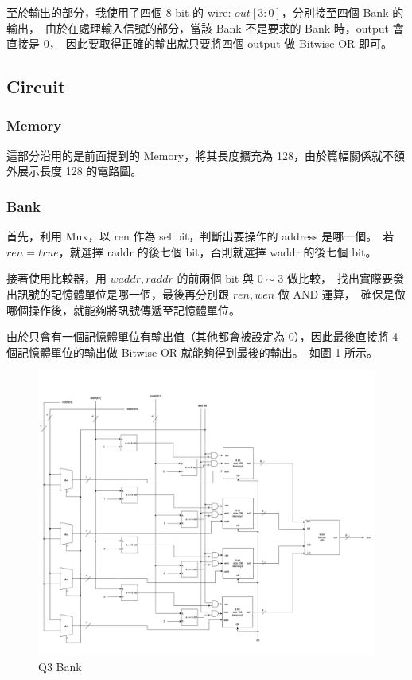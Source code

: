 \documentclass[10.5pt,compsoc,UTF8]{CjC}
\theoremstyle{mystyle}
\begin{document}
至於輸出的部分，我使用了四個 8 bit 的 wire: $out[3:0]$，分別接至四個 Bank 的輸出，\
由於在處理輸入信號的部分，當該 Bank 不是要求的 Bank 時，output 會直接是 $0$，\
因此要取得正確的輸出就只要將四個 output 做 Bitwise OR 即可。

\newpage

\subsection{Circuit}

\subsubsection*{Memory}
這部分沿用的是前面提到的 Memory，將其長度擴充為 128，由於篇幅關係就不額外展示長度 128 的電路圖。

\subsubsection*{Bank}



首先，利用 Mux，以 ren 作為 sel bit，判斷出要操作的 address 是哪一個。\
若 $ren = true$，就選擇 raddr 的後七個 bit，否則就選擇 waddr 的後七個 bit。
\par
接著使用比較器，用 $waddr, raddr$ 的前兩個 bit 與 $0 \sim 3$ 做比較，\
找出實際要發出訊號的記憶體單位是哪一個，最後再分別跟 $ren, wen$ 做 AND 運算，\
確保是做哪個操作後，就能夠將訊號傳遞至記憶體單位。
\par
由於只會有一個記憶體單位有輸出值（其他都會被設定為 0），因此最後直接將 4 個記憶體單位的輸出做 Bitwise OR 就能夠得到最後的輸出。\
如圖 \ref{fig:Q3-Bank} 所示。


\begin{figure}[!h]
  \centering
  \includegraphics[width=\textwidth]{./img/Q3-Bank.png}
  \caption{Q3 Bank}
  \label{fig:Q3-Bank}
\end{figure}
\newpage
\end{document}
